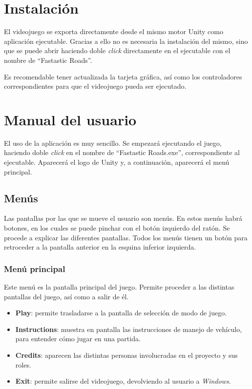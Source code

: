 \section{Instalación}

El videojuego se exporta directamente desde el mismo motor Unity como aplicación ejecutable. Gracias a ello no es necesaria la instalación del mismo, sino que se puede abrir haciendo doble \textit{click} directamente en el ejecutable con el nombre de ``Fastastic Roads''.

Es recomendable tener actualizada la tarjeta gráfica, así como los controladores correspondientes para que el videojuego pueda ser ejecutado.

\section{Manual del usuario}

El uso de la aplicación es muy sencillo. Se empezará ejecutando el juego, haciendo doble \textit{click} en el nombre de ``Fastastic Roads.exe'', correspondiente al ejecutable. Aparecerá el logo de Unity y, a continuación, aparecerá el menú principal.

\subsection{Menús}

Las pantallas por las que se mueve el usuario son menús. En estos menús habrá botones, en los cuales se puede pinchar con el botón izquierdo del ratón. Se procede a explicar las diferentes pantallas. Todos los menús tienen un botón para retroceder a la pantalla anterior en la esquina inferior izquierda.

\subsubsection{Menú principal}

Este menú es la pantalla principal del juego. Permite proceder a las distintas pantallas del juego, así como a salir de él. 
\begin{itemize}
\tightlist
	\item \textbf{Play}: permite trasladarse a la pantalla de selección de modo de juego.
	\item \textbf{Instructions}: muestra en pantalla las instrucciones de manejo de vehículo, para entender cómo jugar en una partida.
	\item \textbf{Credits}: aparecen las distintas personas involucradas en el proyecto y sus roles.
	\item \textbf{Exit}: permite salirse del videojuego, devolviendo al usuario a \textit{Windows}.
\end{itemize}

